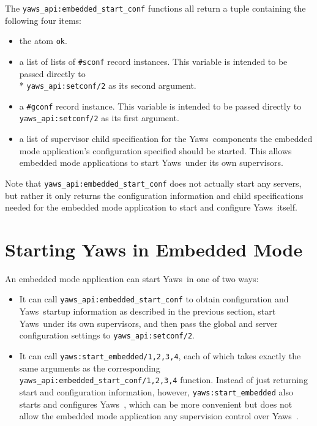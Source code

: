 \documentclass[11pt,oneside,english]{book}
\newcommand{\Yaws}            %
        {{\sc Yaws}}
\begin{document}
The \verb+yaws_api:embedded_start_conf+ functions all return a tuple
containing the following four items:

\begin{itemize}

\item the atom \verb+ok+.

\item a list of lists of \verb+#sconf+ record instances. This variable
  is intended to be passed directly to\\* \verb+yaws_api:setconf/2+ as
  its second argument.

\item a \verb+#gconf+ record instance. This variable is intended to
  be passed directly to \verb+yaws_api:setconf/2+ as its first
  argument.

\item a list of supervisor child specification for the
  \Yaws\  components the embedded mode application's configuration
  specified should be started. This allows embedded mode applications
  to start \Yaws\  under its own supervisors.

\end{itemize}

Note that \verb+yaws_api:embedded_start_conf+ does not actually start
any servers, but rather it only returns the configuration information
and child specifications needed for the embedded mode application to
start and configure \Yaws\  itself.

\section{Starting Yaws in Embedded Mode}

An embedded mode application can start \Yaws\  in one of two ways:

\begin{itemize}

\item It can call \verb+yaws_api:embedded_start_conf+ to obtain
  configuration and \Yaws\  startup information as described in the
  previous section, start \Yaws\  under its own supervisors, and then
  pass the global and server configuration settings to
  \verb+yaws_api:setconf/2+.

\item It can call \verb+yaws:start_embedded/1,2,3,4+, each of which
  takes exactly the same arguments as the corresponding
  \verb+yaws_api:embedded_start_conf/1,2,3,4+ function. Instead of just
  returning start and configuration information, however,
  \verb+yaws:start_embedded+ also starts and configures \Yaws\ , which
  can be more convenient but does not allow the embedded mode
  application any supervision control over \Yaws\ .

\end{itemize}
\end{document}
